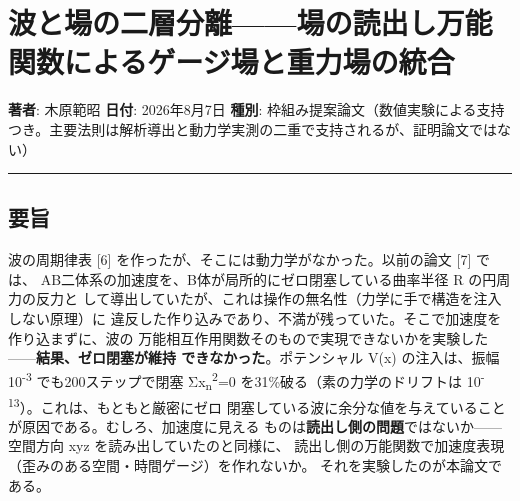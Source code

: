 \documentclass[
]{ltjarticle}
\author{}
\date{}
\begin{document}
\section{波と場の二層分離------場の読出し万能関数によるゲージ場と重力場の統合}\label{ux6ce2ux3068ux5834ux306eux4e8cux5c64ux5206ux96e2ux5834ux306eux8aadux51faux3057ux4e07ux80fdux95a2ux6570ux306bux3088ux308bux30b2ux30fcux30b8ux5834ux3068ux91cdux529bux5834ux306eux7d71ux5408}

\textbf{著者}: 木原範昭 \textbf{日付}: 2026年8月7日 \textbf{種別}:
枠組み提案論文（数値実験による支持つき。主要法則は解析導出と動力学実測の二重で支持されるが、証明論文ではない）

\begin{center}\rule{0.5\linewidth}{0.5pt}\end{center}

\subsection{要旨}\label{ux8981ux65e8}

波の周期律表 {[}6{]} を作ったが、そこには動力学がなかった。以前の論文
{[}7{]} では、 AB二体系の加速度を、B体が局所的にゼロ閉塞している曲率半径
R の円周力の反力と
して導出していたが、これは操作の無名性（力学に手で構造を注入しない原理）に
違反した作り込みであり、不満が残っていた。そこで加速度を作り込まずに、波の
万能相互作用関数そのもので実現できないかを実験した------\textbf{結果、ゼロ閉塞が維持
できなかった}。ポテンシャル V(x) の注入は、振幅 10\textsuperscript{-3}
でも200ステップで閉塞 Σx\textsubscript{n}\textsuperscript{2}=0
を31\%破る（素の力学のドリフトは
10\textsuperscript{-13}）。これは、もともと厳密にゼロ
閉塞している波に余分な値を与えていることが原因である。むしろ、加速度に見える
ものは\textbf{読出し側の問題}ではないか------空間方向 xyz
を読み出していたのと同様に、
読出し側の万能関数で加速度表現（歪みのある空間・時間ゲージ）を作れないか。
それを実験したのが本論文である。
\end{document}
